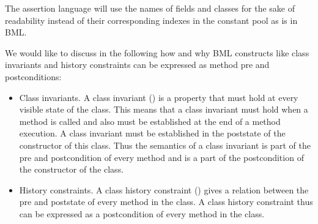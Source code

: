 The assertion language will use the names of fields and classes for the sake of readability instead of their corresponding indexes
in the constant pool as is in BML.

We would like to discuss in the following how and why BML constructs like class invariants and history constraints can be expressed as 
method pre and postconditions:

\begin{itemize}
  \item Class invariants. A class invariant (\ClassInv)  is a property that must hold at every visible state of the class. This means that a
        class invariant must hold when a method is called and also must be established at the end of a method execution. 
	A class invariant must be established in the poststate 
	of the constructor of this class.
	Thus the semantics of
	a class invariant is part of the pre and  postcondition of every method and is a part of the postcondition of the constructor of the class.
  \item History constraints. A class history constraint (\ClassHistoryConstr) gives a relation between the pre and poststate of every method in the class. 
        A class history constraint thus can be expressed as a postcondition of every method in the class.
        
\end{itemize}




